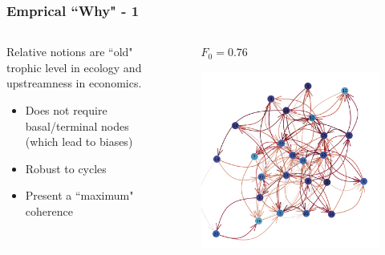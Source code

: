 \documentclass{beamer}
\begin{document}
\begin{frame}
\begin{columns}
\begin{column}{.49\textwidth}
\begin{figure}
            \end{figure}
        \end{column}
    \end{columns}
\end{frame}

\begin{frame}
    \frametitle{Emprical ``Why" - 1}
    \begin{columns}
        \begin{column}{.49\textwidth}
            Relative notions are ``old" trophic level in ecology
            and upstreamness in economics.
            \begin{itemize}
                \item Does not require basal/terminal nodes (which lead to biases)
                \item Robust to cycles
                \item Present a ``maximum" coherence
            \end{itemize}
        \end{column}
        \begin{column}{.49\textwidth}
            \begin{figure}
                \textbf{$F_0 = 0.76$}\par\medskip
                \includegraphics[width=\linewidth,height=\textheight,keepaspectratio]{../../plots/presentations/lv-network-big.png}
            \end{figure}
        \end{column}
    \end{columns}
\end{frame}
\end{document}
